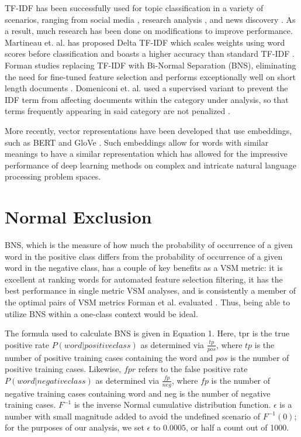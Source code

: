 \documentclass[11pt]{article}
\begin{document}
TF-IDF has been successfully used for topic classification in a variety of scenarios, ranging from social media \cite{lee2011twitter}, research analysis \cite{kim2019research}, and news discovery \cite{hakim2014automated}. As a result, much research has been done on modifications to improve performance. Martineau et. al. has proposed Delta TF-IDF which scales weights using word scores before classification and boasts a higher accuracy than standard TF-IDF \cite{martineau2009delta}. Forman studies replacing TF-IDF with Bi-Normal Separation (BNS), eliminating the need for fine-tuned feature selection and performs exceptionally well on short length documents \cite{forman2003extensive}. Domeniconi et. al. used a supervised variant to prevent the IDF term from affecting documents within the category under analysis, so that terms frequently appearing in said category are not penalized \cite{domeniconi2015comparison}. 

More recently, vector representations have been developed that use embeddings, such as BERT \cite{devlin2018bert} and GloVe \cite{pennington2014glove}. Such embeddings allow for words with similar meanings to have a similar representation which has allowed for the impressive performance of deep learning methods on complex and intricate natural language processing problem spaces.

\section{Normal Exclusion}
BNS, which is the measure of how much the probability of occurrence of a given word in the positive class differs from the probability of occurrence of a given word in the negative class, has a couple of key benefits as a VSM metric: it is excellent at ranking words for automated feature selection filtering, it has the best performance in single metric VSM analyses, and is  consistently a member of the optimal pairs of VSM metrics Forman et al. evaluated \cite{forman2008bns}. Thus, being able to utilize BNS within a one-class context would be ideal.

The formula used to calculate BNS is given in Equation 1. Here, tpr is the true positive rate $P(word | positive class)$ as determined via $\frac{tp}{pos}$, where $tp$ is the number of positive training cases containing the word and $pos$ is the number of positive training cases. Likewise, $fpr$ refers to the false positive rate $P( word | negative class)$ as determined via $\frac{fp}{neg}$, where $fp$ is the number of negative training cases containing word and neg is the number of negative training cases. $F^{-1}$ is the inverse  Normal cumulative distribution function. $\epsilon$ is a number with small magnitude added to avoid the undefined scenario of $F^{-1}(0)$; for the purposes of our analysis, we set $\epsilon$ to $0.0005$, or half a count out of 1000.
\end{document}
